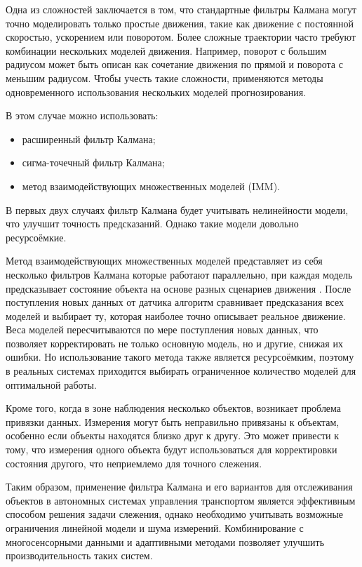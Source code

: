 Одна из сложностей заключается в том, что стандартные фильтры Калмана могут точно 
моделировать только простые движения, такие как движение с постоянной скоростью, 
ускорением или поворотом. Более сложные траектории часто требуют комбинации нескольких 
моделей движения. Например, поворот с большим радиусом может быть описан как сочетание 
движения по прямой и поворота с меньшим радиусом. Чтобы учесть такие сложности, 
применяются методы одновременного использования нескольких моделей прогнозирования.

В этом случае можно использовать:

\begin{itemize}

    \item расширенный фильтр Калмана;
	
	\item сигма-точечный фильтр Калмана;
	
	\item метод взаимодействующих множественных моделей (IMM).
	
\end{itemize}

В первых двух случаях фильтр Калмана будет учитывать нелинейности модели, что улучшит точность
предсказаний. Однако такие модели довольно ресурсоёмкие. 

Метод взаимодействующих множественных моделей представляет из себя несколько фильтров Калмана
которые  работают параллельно, при каждая модель предсказывает состояние объекта на основе 
разных сценариев движения \cite{Uss}. После поступления новых данных от датчика алгоритм сравнивает 
предсказания всех моделей и выбирает ту, которая наиболее точно описывает реальное движение. 
Веса моделей пересчитываются по мере поступления новых данных, что позволяет корректировать 
не только основную модель, но и другие, снижая их ошибки. Но использование такого метода 
также является ресурсоёмким, поэтому в реальных системах приходится выбирать ограниченное
количество моделей для оптимальной работы.

Кроме того, когда в зоне наблюдения несколько объектов, возникает проблема привязки данных.
Измерения могут быть неправильно привязаны к объектам, особенно если объекты находятся близко 
друг к другу. Это может привести к тому, что измерения одного объекта будут использоваться для 
корректировки состояния другого, что неприемлемо для точного слежения.

Таким образом, применение фильтра Калмана и его вариантов для отслеживания объектов в 
автономных системах управления транспортом является эффективным способом решения задачи 
слежения, однако необходимо учитывать возможные ограничения линейной модели и шума измерений. 
Комбинирование с многосенсорными данными и адаптивными методами позволяет улучшить 
производительность таких систем.
